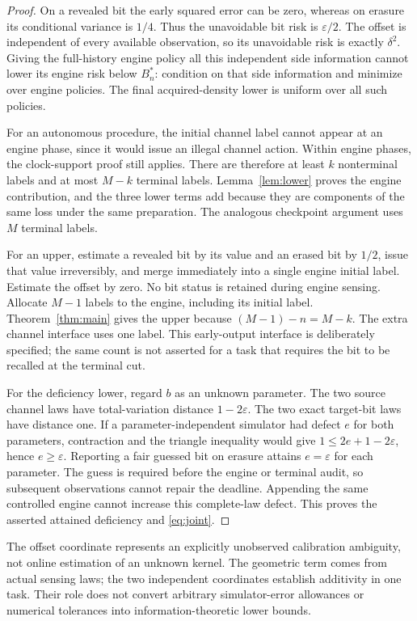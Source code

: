 \begin{proof}
On a revealed bit the early squared error can be zero, whereas on erasure its conditional variance is $1/4$. Thus the unavoidable bit risk is $\varepsilon/2$. The offset is independent of every available observation, so its unavoidable risk is exactly $\delta^2$. Giving the full-history engine policy all this independent side information cannot lower its engine risk below $B_n^*$: condition on that side information and minimize over engine policies. The final acquired-density lower is uniform over all such policies.

For an autonomous procedure, the initial channel label cannot appear at an engine phase, since it would issue an illegal channel action. Within engine phases, the clock-support proof still applies. There are therefore at least $k$ nonterminal labels and at most $M-k$ terminal labels. Lemma~\ref{lem:lower} proves the engine contribution, and the three lower terms add because they are components of the same loss under the same preparation. The analogous checkpoint argument uses $M$ terminal labels.

For an upper, estimate a revealed bit by its value and an erased bit by $1/2$, issue that value irreversibly, and merge immediately into a single engine initial label. Estimate the offset by zero. No bit status is retained during engine sensing. Allocate $M-1$ labels to the engine, including its initial label. Theorem~\ref{thm:main} gives the upper because $(M-1)-n=M-k$. The extra channel interface uses one label. This early-output interface is deliberately specified; the same count is not asserted for a task that requires the bit to be recalled at the terminal cut.

For the deficiency lower, regard $b$ as an unknown parameter. The two source channel laws have total-variation distance $1-2\varepsilon$. The two exact target-bit laws have distance one. If a parameter-independent simulator had defect $e$ for both parameters, contraction and the triangle inequality would give $1\le2e+1-2\varepsilon$, hence $e\ge\varepsilon$. Reporting a fair guessed bit on erasure attains $e=\varepsilon$ for each parameter. The guess is required before the engine or terminal audit, so subsequent observations cannot repair the deadline. Appending the same controlled engine cannot increase this complete-law defect. This proves the asserted attained deficiency and \eqref{eq:joint}.
\end{proof}
The offset coordinate represents an explicitly unobserved calibration ambiguity, not online estimation of an unknown kernel. The geometric term comes from actual sensing laws; the two independent coordinates establish additivity in one task. Their role does not convert arbitrary simulator-error allowances or numerical tolerances into information-theoretic lower bounds.
